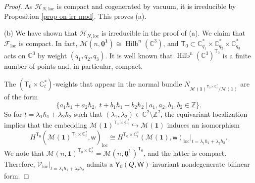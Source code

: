 \documentclass[10pt]{amsart}
\theoremstyle{definition}
\numberwithin{equation}{section}
\newcommand{\bC}{\mathbb{C}}
\newcommand{\bZ}{\mathbb{Z}}
\newcommand{\cF}{\mathcal{F}}
\newcommand{\cH}{\mathcal{H}}
\newcommand{\cM}{\mathcal{M}}
\newcommand{\cV}{\mathcal{V}}
\newcommand{\loc}{\mathrm{loc}}
\newcommand{\sT}{\mathsf{T}}
\newcommand{\sW}{\mathsf{W}}
\newcommand{\sw}{\mathsf{w}}
\newcommand{\Hilb}{\operatorname{Hilb}}
\begin{document}
\begin{proof}
As $\cH_{N,\loc}$ is compact and cogenerated by vacuum, it is irreducible by Proposition \ref{prop on irr mod}. This proves (a).  %

(b) We have shown that $\cH_{N,\loc}$ is irreducible in the proof of (a). We claim that $\cF_\loc$ is compact. In fact, $\cM(n,\underline{\mathbf 0}^{\mathbf 1})\cong \Hilb^n(\bC^3)$, and $\sT_0\subset \bC^*_{q_1}\times \bC^*_{q_2}\times \bC^*_{q_3}$ acts on $\bC^3$ by weight $(q_1,q_2,q_3)$. It is well known that $\Hilb^n(\bC^3)^{\sT_0}$ is a finite number of points and, in particular, compact. 

The $(\sT_0\times \bC^*_t)$-weights that appear in the normal bundle $N_{\cM(\mathbf 1)^{\sT_0\times \bC^*_t}/\cM(\mathbf 1)}$ are of the form 
$$\{a_1\hbar_1+a_2\hbar_2,\: t+b_1\hbar_1+b_2\hbar_2\:|\: a_1,a_2,b_1,b_2\in \bZ\}. $$ 
So for $t=\lambda_1\hbar_1+\lambda_2\hbar_2$ such that $(\lambda_1,\lambda_2)\in \bC^2\setminus\bZ^2$, the equivariant localization implies that the embedding $\cM(\mathbf 1)^{\sT_0\times \bC^*_t}\hookrightarrow\cM(\mathbf 1)$ induces an isomorphism 
$$H^{\sT_0}(\cM(\mathbf 1)^{\sT_0\times \bC^*_t},\sw)_\loc\cong H^{\sT_0\times \bC^*_t}(\cM(\mathbf 1),\sw)_\loc\big|_{t=\lambda_1\hbar_1+\lambda_2\hbar_2}. $$ 
We note that $\cM(n,\mathbf 1)^{\sT_0\times \bC^*_t}=\cM(n,\underline{\mathbf 0}^{\mathbf 1})^{\sT_0}$, and the latter is compact. Therefore, $\cV_{\loc}|_{t=\lambda_1\hbar_1+\lambda_2\hbar_2}$ admits a $\mathsf Y_0(Q,\sW)$-invariant nondegenerate bilinear form.


\end{proof}
\end{document}
